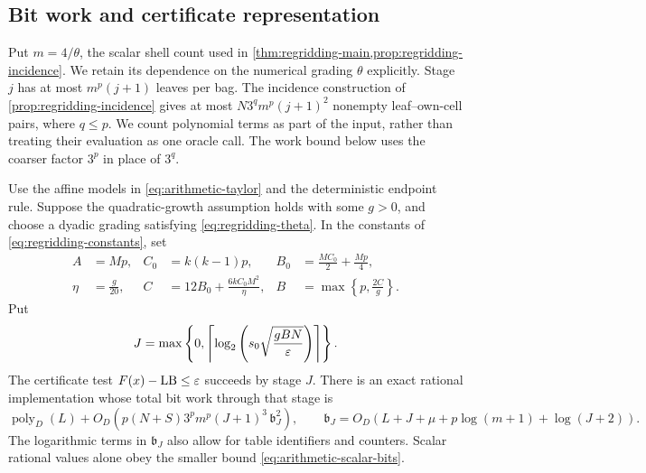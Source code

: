 \subsection{Bit work and certificate representation}

Put $m=4/\theta$, the scalar shell count used in
\cref{thm:regridding-main,prop:regridding-incidence}.  We retain its dependence
on the numerical grading $\theta$ explicitly.  Stage $j$ has at most
$m^p(j+1)$ leaves per bag.  The incidence construction of
\cref{prop:regridding-incidence} gives at most
$N3^q m^p(j+1)^2$ nonempty leaf--own-cell pairs, where $q\le p$.
We count polynomial terms as part of the input, rather than treating their
evaluation as one oracle call.  The work bound below uses the coarser
factor $3^p$ in place of $3^q$.

\begin{theorem}
\label{thm:arithmetic-bit}
Use the affine models in \cref{eq:arithmetic-taylor} and the deterministic
endpoint rule.  Suppose the quadratic-growth assumption holds with some
$g>0$, and choose a dyadic grading satisfying
\cref{eq:regridding-theta}.  In the constants of
\cref{eq:regridding-constants}, set
\[
 \begin{aligned}
 A&=Mp, & C_0&=k(k-1)p,
 & B_0&=\frac{MC_0}{2}+\frac{Mp}{4},\\
 \eta&=\frac g{20},
 & C&=12B_0+\frac{6kC_0M^2}{\eta},
 & B&=\max\left\{p,\frac{2C}{g}\right\}.
 \end{aligned}
\]
Put
\[
 J=\max\left\{0,
 \left\lceil \log_2\left(s_0\sqrt{\frac{gBN}{\varepsilon}}\right)\right\rceil\right\}.
\]
The certificate test $F(x)-\mathrm{LB}\le\varepsilon$ succeeds by stage $J$.  There is an
exact rational implementation whose total bit work through that stage is
\begin{equation}
 \operatorname{poly}_D(L)+
 O_D\!\left(
 p(N+S)3^p m^p(J+1)^3\,\mathfrak b_J^2
 \right),
 \qquad
 \mathfrak b_J=O_D\!\left(L+J+\mu+p\log(m+1)+\log(J+2)\right).
 \label{eq:arithmetic-work}
\end{equation}
The logarithmic terms in $\mathfrak b_J$ also allow for table identifiers
and counters.  Scalar rational values alone obey the smaller bound
\cref{eq:arithmetic-scalar-bits}.
\end{theorem}


